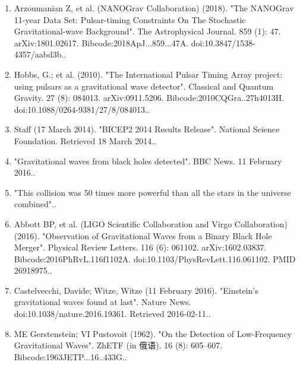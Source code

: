 \begin{enumerate}
\item Arzoumanian Z, et al. (NANOGrav Collaboration) (2018). "The NANOGrav 11-year Data Set: Pulsar-timing Constraints On The Stochastic Gravitational-wave Background". The Astrophysical Journal. 859 (1): 47. arXiv:1801.02617. Bibcode:2018ApJ...859...47A. doi:10.3847/1538-4357/aabd3b..
\item Hobbs, G.; et al. (2010). "The International Pulsar Timing Array project: using pulsars as a gravitational wave detector". Classical and Quantum Gravity. 27 (8): 084013. arXiv:0911.5206. Bibcode:2010CQGra..27h4013H. doi:10.1088/0264-9381/27/8/084013..
\item Staff (17 March 2014). "BICEP2 2014 Results Release". National Science Foundation. Retrieved 18 March 2014..
\item "Gravitational waves from black holes detected". BBC News. 11 February 2016..
\item "This collision was 50 times more powerful than all the stars in the universe combined"..
\item Abbott BP, et al. (LIGO Scientific Collaboration and Virgo Collaboration) (2016). "Observation of Gravitational Waves from a Binary Black Hole Merger". Physical Review Letters. 116 (6): 061102. arXiv:1602.03837. Bibcode:2016PhRvL.116f1102A. doi:10.1103/PhysRevLett.116.061102. PMID 26918975..
\item Castelvecchi, Davide; Witze, Witze (11 February 2016). "Einstein's gravitational waves found at last". Nature News. doi:10.1038/nature.2016.19361. Retrieved 2016-02-11..
\item ME Gerstenstein; VI Pustovoit (1962). "On the Detection of Low-Frequency Gravitational Waves". ZhETF (in 俄语). 16 (8): 605–607. Bibcode:1963JETP...16..433G..
\end{enumerate}

